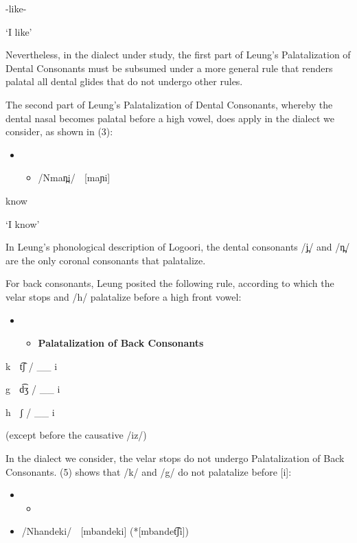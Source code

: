 \documentclass[output=paper]{langsci/langscibook}
\begin{document}
-like-

\textsc{ ‘I }like’

Nevertheless, in the dialect under study, the first part of Leung’s Palatalization of Dental Consonants must be subsumed under a more general rule that renders palatal all dental glides that do not undergo other rules.

The second part of Leung’s Palatalization of Dental Consonants, whereby the dental nasal becomes palatal before a high vowel, does apply in the dialect we consider, as shown in (3):

\begin{itemize}
\item \setcounter{itemize}{0}
\begin{itemize}
\item /Nman̪i/    [maɲi]    

\end{itemize}
\end{itemize}

know

\textsc{‘I }know’

In Leung’s phonological description of Logoori, the dental consonants /j̪/ and /n̪/ are the only coronal consonants that palatalize.    

For back consonants, Leung posited the following rule, according to which the velar stops and /h/ palatalize before a high front vowel:

\begin{itemize}
\item \setcounter{itemize}{0}
\begin{itemize}
\item \textbf{Palatalization of Back Consonants }\citep[116]{Leung1991}

\end{itemize}
\end{itemize}

k  t͡ʃ / \_\_ i

g  d͡ʒ / \_\_ i

h  ʃ / \_\_ i      

(except before the causative /iz/)

In the dialect we consider, the velar stops do not undergo Palatalization of Back Consonants. (5) shows that /k/ and /g/ do not palatalize before [i]:

\begin{itemize}
\item \setcounter{itemize}{0}
\begin{itemize}
\item \end{itemize}
\end{itemize}
\setcounter{itemize}{0}
\begin{itemize}
\item /Nhandeki/    [mbandeki]  (*[mbandet͡ʃi])  

\end{itemize}
\end{document}
